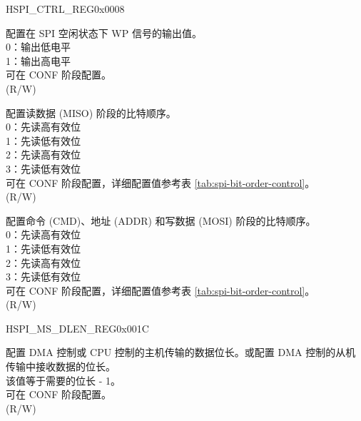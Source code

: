 \addtocounter{Regfloat}{-1}
\begin{register}{H}{SPI\_CTRL\_REG}{0x0008}
\begin{regdesc}\begin{reglist}
\item [接上页]
\label{fielddesc:SPIWPPOL}\item [SPI\_WP\_POL] 配置在 SPI 空闲状态下 WP 信号的输出值。\\
0：输出低电平 \\
1：输出高电平 \\
可在 CONF 阶段配置。\\
(R/W)
\label{fielddesc:SPIRDBITORDER}\item [SPI\_RD\_BIT\_ORDER] 配置读数据 (MISO) 阶段的比特顺序。\\
0：先读高有效位 \\
1：先读低有效位 \\
2：先读高有效位 \\
3：先读低有效位 \\
可在 CONF 阶段配置，详细配置值参考表 \ref{tab:spi-bit-order-control}。\\
(R/W)
\label{fielddesc:SPIWRBITORDER}\item [SPI\_WR\_BIT\_ORDER] 配置命令 (CMD)、地址 (ADDR) 和写数据 (MOSI) 阶段的比特顺序。\\
0：先读高有效位 \\
1：先读低有效位 \\
2：先读高有效位 \\
3：先读低有效位 \\
可在 CONF 阶段配置，详细配置值参考表 \ref{tab:spi-bit-order-control}。\\
(R/W)
\end{reglist}\end{regdesc}
\end{register}


\begin{register}{H}{SPI\_MS\_DLEN\_REG}{0x001C}\label{regdesc:SPIMSDLENREG}
%
%
\regnewline%
\begin{regdesc}\begin{reglist}
\label{fielddesc:SPIMSDATABITLEN}\item [SPI\_MS\_DATA\_BITLEN] 配置 DMA 控制或 CPU 控制的主机传输的数据位长。或配置 DMA 控制的从机传输中接收数据的位长。\\
该值等于需要的位长 - 1。 \\
可在 CONF 阶段配置。\\
(R/W)
\end{reglist}\end{regdesc}
\end{register}


